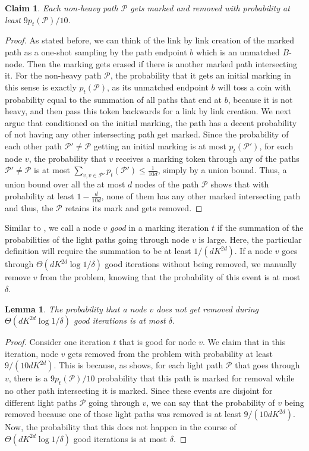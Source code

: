 \documentclass[11pt]{article}
\newtheorem{lemma}[theorem]{Lemma}
\newtheorem{claim}[theorem]{Claim}
\begin{document}
\begin{claim}\label{clm:pathMarking} Each non-heavy path $\mathcal{P}$ gets marked and removed with probability at least $9p_{t}(\mathcal{P})/10$.
\end{claim}
\begin{proof} As stated before, we can think of the link by link creation of the marked path as a one-shot sampling by the path endpoint $b$ which is an unmatched $B$-node. Then the marking gets erased if there is another marked path intersecting it. For the non-heavy path $\mathcal{P}$, the probability that it gets an initial marking in this sense is exactly $p_{t}(\mathcal{P})$, as its unmatched endpoint $b$ will toss a coin with probability equal to the summation of all paths that end at $b$, because it is not heavy, and then pass this token backwards for a link by link creation. We next argue that conditioned on the initial marking, the path has a decent probability of not having any other intersecting path get marked. Since the probability of each other path $\mathcal{P}'\neq \mathcal{P}$ getting an initial marking is at most $p_{t}(\mathcal{P}')$, for each node $v$, the probability that $v$ receives a marking token through any of the paths $\mathcal{P}'\neq \mathcal{P}$ is at most $\sum_{v, v\in \mathcal{P}'} p_{t}(\mathcal{P}') \leq \frac{1}{10d}$, simply by a union bound. Thus, a union bound over all the at most $d$ nodes of the path $\mathcal{P}$ shows that with probability at least $1-\frac{d}{10d}$, none of them has any other marked intersecting path and thus, the $\mathcal{P}$ retains its mark and gets removed.
\end{proof}

Similar to , we call a node $v$ \emph{good} in a marking iteration $t$ if the summation of the probabilities of the light paths going through node $v$ is large. Here, the particular definition will require the summation to be at least $1/(dK^{2d})$. If a node $v$ goes through $\Theta(dK^{2d} \log 1/\delta)$ good iterations without being removed, we manually remove $v$ from the problem, knowing that the probability of this event is at most $\delta$.

\begin{lemma} The probability that a node $v$ does not get removed during $\Theta(dK^{2d} \log 1/\delta)$ good iterations is at most $\delta$.
\end{lemma}
\begin{proof}
Consider one iteration $t$ that is good for node $v$. We claim that in this iteration, node $v$ gets removed from the problem with probability at least $9/(10dK^{2d})$. This is because, as  shows, for each light path $\mathcal{P}$ that goes through $v$, there is a $9p_{t}(\mathcal{P})/10$ probability that this path is marked for removal while no other path intersecting it is marked. Since these events are disjoint for different light paths $\mathcal{P}$ going through $v$, we can say that the probability of $v$ being removed because one of those light paths was removed is at least $9/(10dK^{2d})$. Now, the probability that this does not happen in the course of $\Theta(dK^{2d} \log 1/\delta)$ good iterations is at most $\delta$.
\end{proof}
\end{document}
